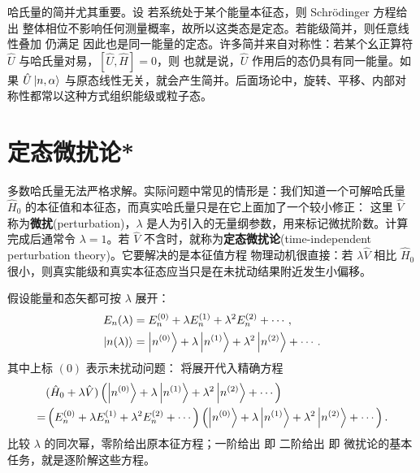 哈氏量的简并尤其重要。设
若系统处于某个能量本征态，则 Schr\"odinger 方程给出
整体相位不影响任何测量概率，故所以这类态是定态。若能级简并，则任意线性叠加
仍满足
因此也是同一能量的定态。许多简并来自对称性：若某个幺正算符 $\hat U$ 与哈氏量对易，$[\hat U,\hat H]=0$，则
也就是说，$\hat U$ 作用后的态仍具有同一能量。如果 $\hat U\ket{n,\alpha}$ 与原态线性无关，就会产生简并。后面场论中，旋转、平移、内部对称性都常以这种方式组织能级或粒子态。

\section{定态微扰论*}


多数哈氏量无法严格求解。实际问题中常见的情形是：我们知道一个可解哈氏量$\hat H_0$ 的本征值和本征态，而真实哈氏量只是在它上面加了一个较小修正：
这里 $\hat V$ 称为\textbf{微扰}(perturbation)，$\lambda$ 是人为引入的无量纲参数，用来标记微扰阶数。计算完成后通常令 $\lambda=1$。若 $\hat V$ 不含时，就称为\textbf{定态微扰论}(time-independent perturbation theory)。它要解决的是本征值方程
物理动机很直接：若 $\lambda\hat V$ 相比 $\hat H_0$ 很小，则真实能级和真实本征态应当只是在未扰动结果附近发生小偏移。

假设能量和态矢都可按 $\lambda$ 展开：
\begin{align}
    E_n(\lambda)
    &=
    E_n^{(0)}
    +\lambda E_n^{(1)}
    +\lambda^2 E_n^{(2)}
    +\cdots,\\
    \ket{n(\lambda)}
    &=
    \ket{n^{(0)}}
    +\lambda\ket{n^{(1)}}
    +\lambda^2\ket{n^{(2)}}
    +\cdots.
\end{align}
其中上标 $(0)$ 表示未扰动问题：
将展开代入精确方程
\begin{align*}
    &(\hat H_0+\lambda\hat V)
    \left(
        \ket{n^{(0)}}+\lambda\ket{n^{(1)}}+\lambda^2\ket{n^{(2)}}+\cdots
    \right)\\
    =&
    \left(
        E_n^{(0)}+\lambda E_n^{(1)}+\lambda^2 E_n^{(2)}+\cdots
    \right)
    \left(
        \ket{n^{(0)}}+\lambda\ket{n^{(1)}}+\lambda^2\ket{n^{(2)}}+\cdots
    \right).
\end{align*}
比较 $\lambda$ 的同次幂，零阶给出原本征方程；一阶给出
即
二阶给出
即
微扰论的基本任务，就是逐阶解这些方程。

